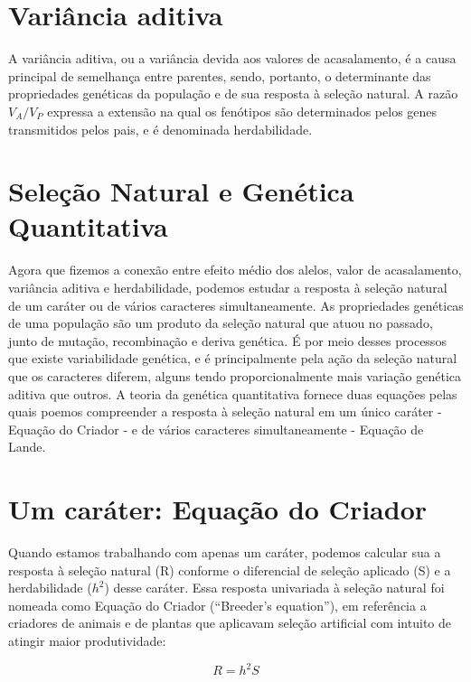 \documentclass[portuges,]{tufte-handout}
\begin{document}
\section{Variância aditiva}\label{variuxe2ncia-aditiva}

A variância aditiva, ou a variância devida aos valores de acasalamento,
é a causa principal de semelhança entre parentes, sendo, portanto, o
determinante das propriedades genéticas da população e de sua resposta à
seleção natural. A razão \(V_A/V_P\) expressa a extensão na qual os
fenótipos são determinados pelos genes transmitidos pelos pais, e é
denominada herdabilidade.

\section{Seleção Natural e Genética
Quantitativa}\label{seleuxe7uxe3o-natural-e-genuxe9tica-quantitativa}

Agora que fizemos a conexão entre efeito médio dos alelos, valor de
acasalamento, variância aditiva e herdabilidade, podemos estudar a
resposta à seleção natural de um caráter ou de vários caracteres
simultaneamente. As propriedades genéticas de uma população são um
produto da seleção natural que atuou no passado, junto de mutação,
recombinação e deriva genética. É por meio desses processos que existe
variabilidade genética, e é principalmente pela ação da seleção natural
que os caracteres diferem, alguns tendo proporcionalmente mais variação
genética aditiva que outros. A teoria da genética quantitativa fornece
duas equações pelas quais poemos compreender a resposta à seleção
natural em um único caráter - Equação do Criador - e de vários
caracteres simultaneamente - Equação de Lande.

\section{Um caráter: Equação do
Criador}\label{um-caruxe1ter-equauxe7uxe3o-do-criador}

Quando estamos trabalhando com apenas um caráter, podemos calcular sua a
resposta à seleção natural (R) conforme o diferencial de seleção
aplicado (S) e a herdabilidade (\(h^2\)) desse caráter. Essa resposta
univariada à seleção natural foi nomeada como Equação do Criador
(``Breeder's equation''), em referência a criadores de animais e de
plantas que aplicavam seleção artificial com intuito de atingir maior
produtividade:

\[
R = h^2S
\]
\end{document}
